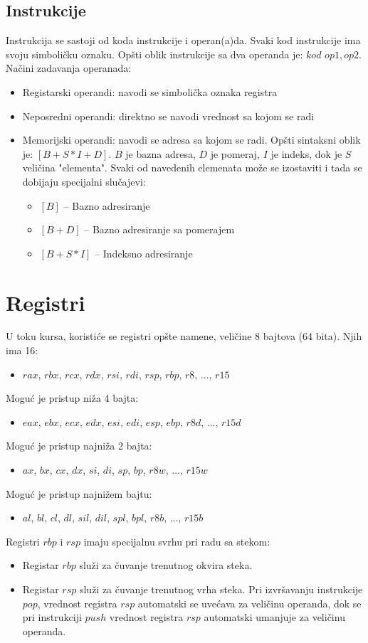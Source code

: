 \documentclass[a4paper, 10pt]{article}
\begin{document}
	\subsection{Instrukcije}
	Instrukcija se sastoji od koda instrukcije i operan(a)da. Svaki kod instrukcije ima svoju simboličku oznaku. Opšti oblik instrukcije sa dva operanda je: $kod$ $op1, op2$.
Načini zadavanja operanada:	
	\begin{itemize}
		\item Registarski operandi: navodi se simbolička oznaka registra
		\item Neposredni operandi: direktno se navodi vrednost sa kojom se radi
		\item Memorijski operandi: navodi se adresa sa kojom se radi. Opšti sintaksni oblik je: $[B + S*I + D]$. $B$ je bazna adresa, $D$ je pomeraj, $I$ je indeks, dok je $S$ veličina "elementa". Svaki od navedenih elemenata može se izostaviti i tada se dobijaju specijalni slučajevi:
		\begin{itemize}
			\item $[B]$ -- Bazno adresiranje
			\item $[B + D]$ -- Bazno adresiranje sa pomerajem
			\item $[B + S*I]$ -- Indeksno adresiranje
		\end{itemize}
	\end{itemize}
\section{Registri} 
U toku kursa, koristiće se registri opšte namene, veličine 8 bajtova (64 bita). Njih ima 16:
	\begin{itemize}
		\item $rax$, $rbx$, $rcx$, $rdx$, $rsi$, $rdi$, $rsp$, $rbp$, $r8$, ..., $r15$
	\end{itemize}
Moguć je pristup niža 4 bajta:
	\begin{itemize}
		\item $eax$, $ebx$, $ecx$, $edx$, $esi$, $edi$, $esp$, $ebp$, $r8d$, ..., $r15d$
	\end{itemize}
	Moguć je pristup najniža 2 bajta:
	\begin{itemize}
		\item $ax$, $bx$, $cx$, $dx$, $si$, $di$, $sp$, $bp$, $r8w$, ..., $r15w$
	\end{itemize}
	Moguć je pristup najnižem bajtu:
	\begin{itemize}
		\item $al$, $bl$, $cl$, $dl$, $sil$, $dil$, $spl$, $bpl$, $r8b$, ..., $r15b$
	\end{itemize}
Registri $rbp$ i $rsp$ imaju specijalnu svrhu pri radu sa stekom:
	\begin{itemize}
			\item Registar $rbp$ služi za čuvanje trenutnog okvira steka.
			\item Registar $rsp$ služi za čuvanje trenutnog vrha steka. Pri izvršavanju instrukcije $pop$, vrednost registra $rsp$ automatski se uvećava za veličinu operanda, dok se pri instrukciji $push$ vrednost registra $rsp$ automatski umanjuje za veličinu operanda.
	\end{itemize}
\end{document}
